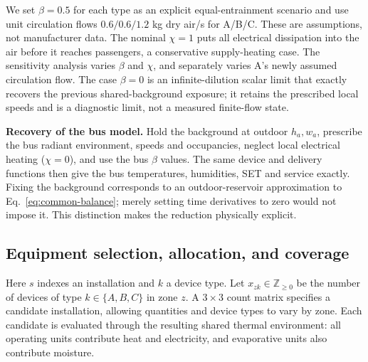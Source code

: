 We set $\beta=0.5$ for each type as an explicit equal-entrainment scenario and use unit circulation flows $0.6/0.6/1.2$ kg dry air/s for A/B/C. These are assumptions, not manufacturer data. The nominal $\chi=1$ puts all electrical dissipation into the air before it reaches passengers, a conservative supply-heating case. The sensitivity analysis varies $\beta$ and $\chi$, and separately varies A's newly assumed circulation flow. The case $\beta=0$ is an infinite-dilution scalar limit that exactly recovers the previous shared-background exposure; it retains the prescribed local speeds and is a diagnostic limit, not a measured finite-flow state.

\noindent\textbf{Recovery of the bus model.} Hold the background at outdoor $h_a,w_a$, prescribe the bus radiant environment, speeds and occupancies, neglect local electrical heating ($\chi=0$), and use the bus $\beta$ values. The same device and delivery functions then give the bus temperatures, humidities, SET and service exactly. Fixing the background corresponds to an outdoor-reservoir approximation to Eq.~\eqref{eq:common-balance}; merely setting time derivatives to zero would not impose it. This distinction makes the reduction physically explicit.

\subsection{Equipment selection, allocation, and coverage}

Here $s$ indexes an installation and $k$ a device type. Let $x_{zk}\in\mathbb Z_{\ge0}$ be the number of devices of type $k\in\{A,B,C\}$ in zone $z$. A $3\times3$ count matrix specifies a candidate installation, allowing quantities and device types to vary by zone. Each candidate is evaluated through the resulting shared thermal environment: all operating units contribute heat and electricity, and evaporative units also contribute moisture.

